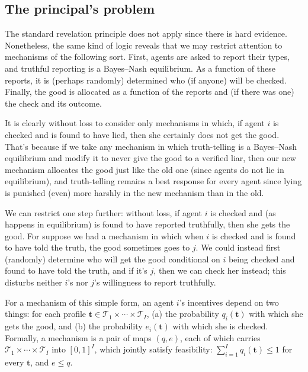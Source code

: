 \subsection{The principal's problem}
\label{sec:ch2:bdl14:first}

The standard revelation principle does not apply since there is hard evidence.
Nonetheless, the same kind of logic reveals that we may restrict attention to mechanisms of the following sort. First, agents are asked to report their types, and truthful reporting is a Bayes--Nash equilibrium.
As a function of these reports, it is (perhaps randomly) determined who (if anyone) will be checked.
Finally, the good is allocated as a function of the reports and (if there was one) the check and its outcome.

It is clearly without loss to consider only mechanisms in which,
if agent $i$ is checked and is found to have lied, then she certainly does not get the good.
That's because
if we take any mechanism in which truth-telling is a Bayes--Nash equilibrium
and modify it to never give the good to a verified liar,
then our new mechanism allocates the good just like the old one (since agents do not lie in equilibrium),
and truth-telling remains a best response for every agent
since lying is punished (even) more harshly in the new mechanism than in the old.

We can restrict one step further: without loss,
if agent $i$ is checked and (as happens in equilibrium) is found to have reported truthfully, then she gets the good.
For suppose we had a mechanism in which when $i$ is checked and is found to have told the truth, the good sometimes goes to $j$.
We could instead first (randomly) determine who will get the good conditional on $i$ being checked and found to have told the truth, and if it's $j$, then we can check her instead;
this disturbs neither $i$'s nor $j$'s willingness to report truthfully.

For a mechanism of this simple form, an agent $i$'s incentives depend on two things:
for each profile $\boldsymbol{t} \in \mathcal{T}_1 \times \cdots \times \mathcal{T}_I$,
(a) the probability $q_i(\boldsymbol{t})$ with which she gets the good, and
(b) the probability $e_i(\boldsymbol{t})$ with which she is checked.
Formally, a mechanism is a pair of maps $(q,e)$, each of which carries $\mathcal{T}_1 \times \cdots \times \mathcal{T}_I$ into $[0,1]^I$, which jointly satisfy feasibility:
$\sum_{i=1}^I q_i(\boldsymbol{t}) \leq 1$ for every $\boldsymbol{t}$,
and $e \leq q$.


